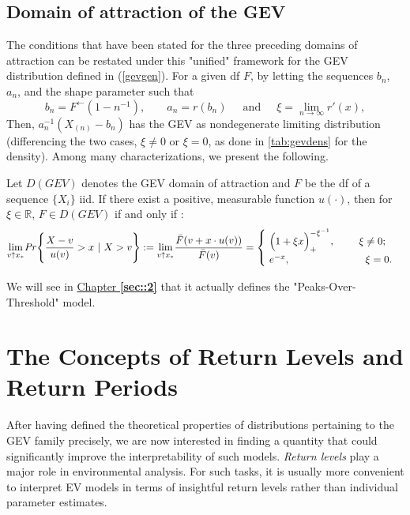 \subsection{Domain of attraction of the GEV}
The conditions that have been stated for the three preceding domains of attraction can be restated under this "unified" framework for the GEV distribution defined in (\ref{gevgen}).
For a given df $F$, by letting the sequences $b_n$, $a_n$, and the shape parameter such that
\begin{equation*}
b_n=F^{\leftarrow}(1-n^{-1})\text{, } \ \ \ \ \ \ \ \ a_n=r(b_n) \ \ \ \ \ \text{ and } \ \ \ \ \ \xi=\displaystyle{\lim_{n \to \infty}}r'(x),
\end{equation*}
 Then, $a_n^{-1}(X_{(n)}-b_n)$ has the GEV as nondegenerate limiting distribution (differencing the two cases, $\xi\neq 0$ or $\xi=0$, as done in \ref{tab:gevdens} for the density).
 Among many characterizations, we present the following. 
\begin{theorem}
	Let $D(GEV)$ denotes the GEV domain of attraction and $F$ be the df of a sequence $\{X_i\}$ iid. If there exist a positive, measurable function $u(\cdot)$, then for $\xi\in\mathbb{R}$, $F\in D(GEV)$ if and only if :
	\begin{equation}
	\displaystyle{\lim_{v \uparrow x_*}} \text{\emph{Pr}} \Bigg\{\frac{X-v}{u(v)}>x \ | \ X>v\Bigg\}:=\displaystyle{\lim_{v \uparrow x_*}}\frac{\bar{F}(v+x\cdot u(v))}{\bar{F}(v)}=\begin{cases}
	\ \Big(1+\xi x\Big)_+^{-\xi^{-1}}, \ \ \ \ \ \ \ \xi\neq 0;    \\
	\  e^{-x}, \ \ \ \ \ \ \ \ \ \ \ \ \ \ \ \ \qquad \xi=0.
	\end{cases}
	\end{equation}
\end{theorem}
We will see in \hyperref[sec::2]{Chapter \textbf{\ref{sec::2}}} that it actually defines the "Peaks-Over-Threshold" model.

\section{The Concepts of Return Levels and Return Periods}\label{rlgev}


After having defined the theoretical properties of distributions pertaining to the GEV family precisely, we are now interested in finding a quantity that could significantly improve the interpretability of such models.
\emph{Return levels} play a major role in environmental analysis. For such tasks, it is usually more convenient to interpret EV models in terms of insightful return levels rather than individual parameter estimates. 

